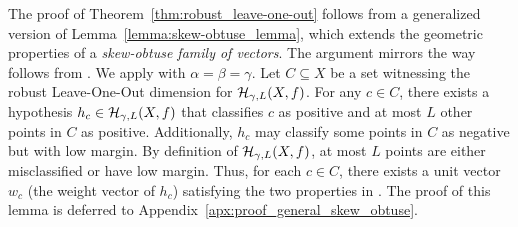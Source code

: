 
The proof of Theorem~\ref{thm:robust_leave-one-out} follows from a generalized version of Lemma~\ref{lemma:skew-obtuse_lemma}, which extends the geometric properties of a \emph{skew-obtuse family of vectors}. The argument mirrors the way  follows from .  
We apply  with $\alpha = \beta = \gamma$. Let $C \subseteq X$ be a set witnessing the robust Leave-One-Out dimension for $\mathcal{H}_{\gamma,L}(X,f)$. For any $c \in C$, there exists a hypothesis $h_c \in \mathcal{H}_{\gamma,L}(X,f)$ that classifies $c$ as positive and at most $L$ other points in $C$ as positive. Additionally, $h_c$ may classify some points in $C$ as negative but with low margin.  
By definition of $\mathcal{H}_{\gamma,L}(X,f)$, at most $L$ points are either misclassified or have low margin. Thus, for each $c \in C$, there exists a unit vector $w_c$ (the weight vector of $h_c$) satisfying the two properties in .  
The proof of this lemma is deferred to Appendix~\ref{apx:proof_general_skew_obtuse}.

